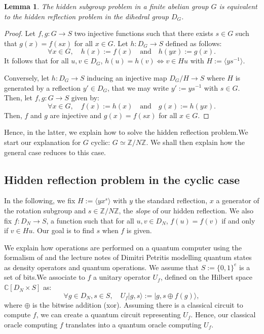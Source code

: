 \documentclass[a4paper,10pt]{report}
\theoremstyle{definition}
\theoremstyle{plain}
\newtheorem{Lemma}[Definition]{Lemma}
\theoremstyle{definition}
\newcommand{\Z}{\mathbb{Z}}
\newcommand{\C}{\mathbb{C}}
\renewcommand{\(}{\left(}
\renewcommand{\)}{\right)}
\begin{document}
\begin{Lemma}
The hidden subgroup problem in a finite abelian group $G$ is equivalent to the hidden reflection problem in the dihedral group $D_G$.
\end{Lemma}

\begin{proof}
Let $f,g: G\longrightarrow S$ two injective functions such that there exists $s\in G$ such that $g(x)=f(sx)$ for all $x\in G$.  Let $h: D_G\longrightarrow S$ defined as follows:
\[\forall x\in G, \quad h(x):=f(x) \quad \mbox{and} \quad h(yx):=g(x).\]
It follows that for all $u,v\in D_G$, $h(u)=h(v)\Longleftrightarrow v\in Hu$ with $H:=\langle ys^{-1}\rangle$.

Conversely, let $h: D_G\longrightarrow S$ inducing an injective map $D_G/H\longrightarrow S$ where $H$ is generated by a reflection $y'\in D_G$, that we may write $y':=ys^{-1}$ with $s\in G$. Then, let $f, g:G\longrightarrow S$ given by:
\[\forall x\in G, \quad f(x):=h(x) \quad \mbox{and} \quad g(x):=h(yx).\]
Then, $f$ and $g$ are injective and $g(x)=f(sx)$ for all $x\in G$.
\end{proof}

Hence, in the latter, we explain how to solve the hidden reflection problem.We start our explanation for $G$ cyclic: $G\simeq\Z/N\Z$. We shall then explain how the general case reduces to this case. 

\subsection{Hidden reflection problem in the cyclic case}

In the following, we fix $H:=\langle yx^s\rangle$ with $y$ the standard reflection, $x$ a generator of the rotation subgroup and $s\in\Z/N\Z$, the \emph{slope} of our hidden reflection.  We also fix $f:D_N\longrightarrow S$, a function such that for all $u, v\in D_N$, $f(u)=f(v)$ if and only if $v\in Hu$. Our goal is to find $s$ when $f$ is given.

We explain how operations are performed on a quantum computer using the formalism of \cite[chapter 8]{NielsanChaung} and the lecture notes of Dimitri Petritis modelling quantum states as density operators and quantum operations. We assume that $S:=\{0,1\}^e$ is a set of bits.We associate to $f$ a unitary operator $U_f$, defined on the Hilbert space $\C[D_N\times S]$ as:
\[\forall g\in D_N, s\in S, \quad U_f|g,s\rangle:=|g,s\oplus f(g)\rangle,\]
where $\oplus$ is the bitwise addition (xor). Assuming there is a classical circuit to compute $f$, we can create a quantum circuit representing $U_f$. Hence, our classical oracle computing $f$ translates into a quantum oracle computing $U_f$. 
\end{document}
